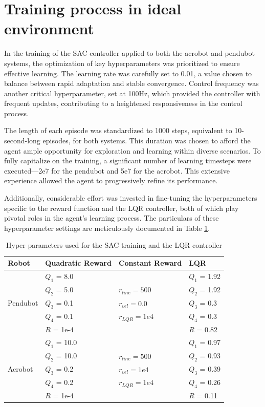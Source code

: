 \section{Training process in ideal environment}
In the training of the SAC controller applied to both the acrobot and pendubot systems, the optimization of key hyperparameters was prioritized to ensure effective learning. The learning rate was carefully set to 0.01, a value chosen to balance between rapid adaptation and stable convergence. Control frequency was another critical hyperparameter, set at 100Hz, which provided the controller with frequent updates, contributing to a heightened responsiveness in the control process.

The length of each episode was standardized to 1000 steps, equivalent to 10-second-long episodes, for both systems. This duration was chosen to afford the agent ample opportunity for exploration and learning within diverse scenarios. To fully capitalize on the training, a significant number of learning timesteps were executed—2e7 for the pendubot and 5e7 for the acrobot. This extensive experience allowed the agent to progressively refine its performance.

Additionally, considerable effort was invested in fine-tuning the hyperparameters specific to the reward function and the LQR controller, both of which play pivotal roles in the agent's learning process. The particulars of these hyperparameter settings are meticulously documented in Table \ref{tab:training_parameters}.

\begin{table}[H]
  \centering
  \begin{tabular}{p{2cm} | p{3cm} | p{3cm} | p{3cm}}
  Robot & Quadratic Reward  & Constant Reward & LQR\\
  \hline
  \multirow{5}{*}{Pendubot} & \(Q_1\) = 8.0  &  & \(Q_1\) = 1.92\\
  & \(Q_2\) = 5.0  & \(r_{line}=500\) & \(Q_2\) = 1.92\\
  & \(Q_3\) = 0.1  & \(r_{vel}=0.0\) & \(Q_3\) = 0.3\\
  & \(Q_4\) = 0.1  & \(r_{LQR}=1e4\)& \(Q_4\) = 0.3\\
  & \(R\) = 1e-4  & & \(R\) = 0.82\\
  \hline
  \multirow{5}{*}{Acrobot} & \(Q_1\) = 10.0  &  & \(Q_1\) = 0.97\\
  & \(Q_2\) = 10.0  & \(r_{line}=500\) & \(Q_2\) = 0.93\\
  & \(Q_3\) = 0.2  & \(r_{vel}=1e4\) & \(Q_3\) = 0.39\\
  & \(Q_4\) = 0.2  & \(r_{LQR}=1e4\) & \(Q_4\) = 0.26\\
  & \(R\) = 1e-4  &  & \(R\) = 0.11\\
  \end{tabular}
 \caption{Hyper parameters used for the SAC training and the LQR controller}
 \label{tab:training_parameters}
\end{table}

